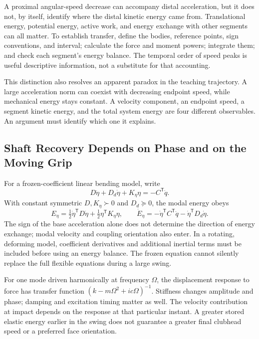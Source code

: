 A proximal angular-speed decrease can accompany distal acceleration, but it does not, by itself, identify where the distal kinetic energy came from. Translational energy, potential energy, active work, and energy exchange with other segments can all matter. To establish transfer, define the bodies, reference points, sign conventions, and interval; calculate the force and moment powers; integrate them; and check each segment's energy balance. The temporal order of speed peaks is useful descriptive information, not a substitute for that accounting.

This distinction also resolves an apparent paradox in the teaching trajectory. A large acceleration norm can coexist with decreasing endpoint speed, while mechanical energy stays constant. A velocity component, an endpoint speed, a segment kinetic energy, and the total system energy are four different observables. An argument must identify which one it explains.

\subsection{Shaft Recovery Depends on Phase and on the Moving Grip}

For a frozen-coefficient linear bending model, write
\begin{equation}
 D\ddot\eta+D_d\dot\eta+K_\eta\eta=-C^{\mathsf T}\ddot q.
\end{equation}
With constant symmetric $D,K_\eta\succ0$ and $D_d\succeq0$, the modal energy obeys
\begin{equation}
 E_\eta=\tfrac12\dot\eta^{\mathsf T}D\dot\eta+\tfrac12\eta^{\mathsf T}K_\eta\eta,
 \qquad
 \dot E_\eta=-\dot\eta^{\mathsf T}C^{\mathsf T}\ddot q-\dot\eta^{\mathsf T}D_d\dot\eta.
\end{equation}
The sign of the base acceleration alone does not determine the direction of energy exchange; modal velocity and coupling orientation also enter. In a rotating, deforming model, coefficient derivatives and additional inertial terms must be included before using an energy balance. The frozen equation cannot silently replace the full flexible equations during a large swing.

For one mode driven harmonically at frequency $\Omega$, the displacement response to force has transfer function $(k-m\Omega^2+i c\Omega)^{-1}$. Stiffness changes amplitude and phase; damping and excitation timing matter as well. The velocity contribution at impact depends on the response at that particular instant. A greater stored elastic energy earlier in the swing does not guarantee a greater final clubhead speed or a preferred face orientation.

